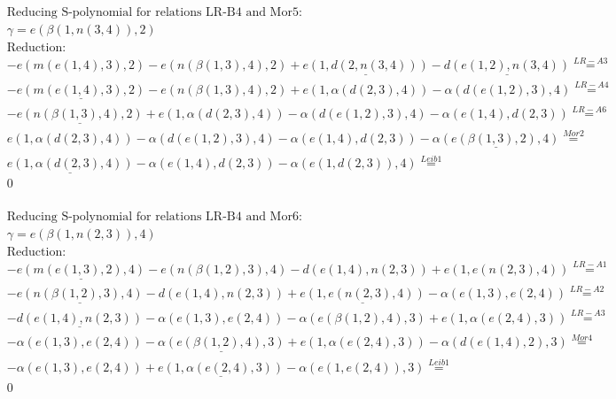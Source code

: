 \documentclass[11pt]{amsart}
\begin{document}
\begin{align*} 
& \text{Reducing S-polynomial for relations LR-B4 and Mor5:} \\ 
& \gamma = e(\beta(1,n(3,4)),2) \\ 
& \text{Reduction}: \\& - e(m(e(1,4),3),2) - e(n(\beta(1,3),4),2) + \underline{e(1,d(2,n(3,4)))} - \underline{d(e(1,2),n(3,4))} \stackrel{ LR-A3 }{=}  \\ 
& - \underline{e(m(e(1,4),3),2)} - e(n(\beta(1,3),4),2) + e(1,\alpha(d(2,3),4)) - \alpha(d(e(1,2),3),4) \stackrel{ LR-A4 }{=}  \\ 
& - \underline{e(n(\beta(1,3),4),2)} + e(1,\alpha(d(2,3),4)) - \alpha(d(e(1,2),3),4) - \alpha(e(1,4),d(2,3)) \stackrel{ LR-A6 }{=}  \\ 
&e(1,\alpha(d(2,3),4)) - \alpha(d(e(1,2),3),4) - \alpha(e(1,4),d(2,3)) - \underline{\alpha(e(\beta(1,3),2),4)} \stackrel{ Mor2 }{=}  \\ 
&\underline{e(1,\alpha(d(2,3),4))} - \alpha(e(1,4),d(2,3)) - \alpha(e(1,d(2,3)),4) \stackrel{ Leib1 }{=}  \\ 
&0\\ 
\end{align*} 
 
\begin{align*} 
& \text{Reducing S-polynomial for relations LR-B4 and Mor6:} \\ 
& \gamma = e(\beta(1,n(2,3)),4) \\ 
& \text{Reduction}: \\& - \underline{e(m(e(1,3),2),4)} - e(n(\beta(1,2),3),4) - d(e(1,4),n(2,3)) + e(1,e(n(2,3),4)) \stackrel{ LR-A1 }{=}  \\ 
& - \underline{e(n(\beta(1,2),3),4)} - d(e(1,4),n(2,3)) + \underline{e(1,e(n(2,3),4))} - \alpha(e(1,3),e(2,4)) \stackrel{ LR-A2 }{=}  \\ 
& - \underline{d(e(1,4),n(2,3))} - \alpha(e(1,3),e(2,4)) - \alpha(e(\beta(1,2),4),3) + e(1,\alpha(e(2,4),3)) \stackrel{ LR-A3 }{=}  \\ 
& - \alpha(e(1,3),e(2,4)) - \underline{\alpha(e(\beta(1,2),4),3)} + e(1,\alpha(e(2,4),3)) - \alpha(d(e(1,4),2),3) \stackrel{ Mor4 }{=}  \\ 
& - \alpha(e(1,3),e(2,4)) + \underline{e(1,\alpha(e(2,4),3))} - \alpha(e(1,e(2,4)),3) \stackrel{ Leib1 }{=}  \\ 
&0\\ 
\end{align*} 
 
\end{document}

